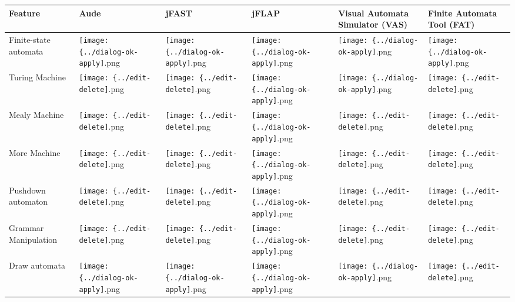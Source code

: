       \noindent\begin{tabularx}{\linewidth}{|*{6}{X|}}
\hline
{\bfseries  Feature                    } & {\bfseries  Aude         } & {\bfseries  jFAST} & {\bfseries jFLAP  } & {\bfseries  Visual Automata Simulator (VAS) } & {\bfseries Finite Automata Tool (FAT)}\tabularnewline
\hline
 Finite-state automata        &  \texttt{[image: \{../dialog-ok-apply]}.png}            &  \texttt{[image: \{../dialog-ok-apply]}.png}    &  \texttt{[image: \{../dialog-ok-apply]}.png}     &  \texttt{[image: \{../dialog-ok-apply]}.png}                        &  \texttt{[image: \{../dialog-ok-apply]}.png}\tabularnewline
\hline
 Turing Machine               &  \texttt{[image: \{../edit-delete]}.png}             &  \texttt{[image: \{../edit-delete]}.png}     &  \texttt{[image: \{../dialog-ok-apply]}.png}     &  \texttt{[image: \{../dialog-ok-apply]}.png}                        &  \texttt{[image: \{../edit-delete]}.png}\tabularnewline
\hline
 Mealy Machine                &  \texttt{[image: \{../edit-delete]}.png}             &  \texttt{[image: \{../edit-delete]}.png}     &  \texttt{[image: \{../dialog-ok-apply]}.png}     &  \texttt{[image: \{../edit-delete]}.png}                         &  \texttt{[image: \{../edit-delete]}.png}\tabularnewline
\hline
 More Machine                 &  \texttt{[image: \{../edit-delete]}.png}             &  \texttt{[image: \{../edit-delete]}.png}     &  \texttt{[image: \{../dialog-ok-apply]}.png}     &  \texttt{[image: \{../edit-delete]}.png}                         &  \texttt{[image: \{../edit-delete]}.png}\tabularnewline
\hline
 Pushdown automaton           &  \texttt{[image: \{../edit-delete]}.png}             &  \texttt{[image: \{../edit-delete]}.png}     &  \texttt{[image: \{../dialog-ok-apply]}.png}     &  \texttt{[image: \{../edit-delete]}.png}                         &  \texttt{[image: \{../edit-delete]}.png}\tabularnewline
\hline
 Grammar Manipulation         &  \texttt{[image: \{../edit-delete]}.png}             &  \texttt{[image: \{../edit-delete]}.png}     &  \texttt{[image: \{../dialog-ok-apply]}.png}     &  \texttt{[image: \{../edit-delete]}.png}                         &  \texttt{[image: \{../edit-delete]}.png}  \tabularnewline
\hline
 Draw automata                &  \texttt{[image: \{../dialog-ok-apply]}.png}            &  \texttt{[image: \{../dialog-ok-apply]}.png}    &  \texttt{[image: \{../dialog-ok-apply]}.png}     &  \texttt{[image: \{../dialog-ok-apply]}.png}                        &  \texttt{[image: \{../edit-delete]}.png}\tabularnewline

\end{tabularx}
